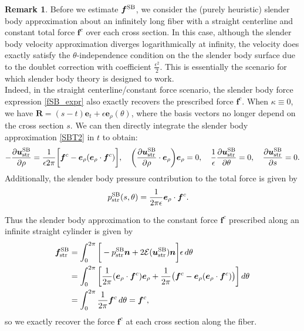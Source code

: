 \documentclass[11pt]{article}
\numberwithin{equation}{section}
\newcommand{\E}{\mathcal{E}}
\newcommand{\bu}{\bm{u}}
\newcommand{\be}{\bm{e}}
\newcommand{\p}{\partial}
\newcommand{\ts}{\thinspace}
\newcommand{\SB}{{\rm SB}}
\theoremstyle{definition}
\newtheorem{remark}[theorem]{Remark}
\begin{document}
\begin{remark} 
Before we estimate $\bm{f}^{\SB}$, we consider the (purely heuristic) slender body approximation about an infinitely long fiber with a straight centerline and constant total force $\bm{f}^c$ over each cross section. In this case, although the slender body velocity approximation diverges logarithmically at infinity, the velocity does exactly satisfy the $\theta$-independence condition on the the slender body surface due to the doublet correction with coefficient $\frac{\epsilon^2}{2}$. This is essentially the scenario for which slender body theory is designed to work.  \\
 
Indeed, in the straight centerline/constant force scenario, the slender body force expression \eqref{fSB_expr} also exactly recovers the prescribed force $\bm{f}^c$. When $\kappa\equiv0$, we have $\bm{R}= (s-t)\be_t+\epsilon\be_{\rho}(\theta)$, where the basis vectors no longer depend on the cross section $s$. We can then directly integrate the slender body approximation \eqref{SBT2} in $t$ to obtain: 
\begin{equation}\label{straight_center}
-\frac{\p \bu^{\SB}_{\text{str}}}{\p\rho} = \frac{1}{\epsilon2\pi} \bigg[\bm{f}^c - \be_{\rho}(\be_{\rho}\cdot\bm{f}^c)\bigg], \quad \bigg(\frac{\p \bu^{\SB}_{\text{str}}}{\p\rho}\cdot\be_{\rho}\bigg)\be_{\rho}  = 0, \quad
\frac{1}{\epsilon}\frac{\p \bu^{\SB}_{\text{str}}}{\p \theta} =0, \quad
\frac{\p \bu^{\SB}_{\text{str}}}{\p s} = 0.
\end{equation}
Additionally, the slender body pressure contribution to the total force is given by
\begin{equation}\label{pressure_exact}
\begin{aligned}
p^{\SB}_{\text{str}}(s,\theta) &= \frac{1}{ 2\pi \epsilon} \be_{\rho}\cdot \bm{f}^c.
\end{aligned}
\end{equation}

Thus the slender body approximation to the constant force $\bm{f}^c$ prescribed along an infinite straight cylinder is given by
\begin{equation}
\begin{aligned}
{\bm f}^{\SB}_{\text{str}} &= \int_0^{2\pi} \bigg[-p^{\SB}_{\text{str}}{\bm n} + 2\E(\bu^{\SB}_{\text{str}}){\bm n} \bigg] \epsilon \ts d\theta \\
&= \int_0^{2\pi} \bigg[\frac{1}{2\pi} (\be_{\rho}\cdot\bm{f}^c)\be_{\rho} + \frac{1}{2\pi}\big(\bm{f}^c - \be_{\rho}(\be_{\rho}\cdot\bm{f}^c)\big) \bigg] \ts d\theta \\
&= \int_0^{2\pi} \frac{1}{2\pi}\bm{f}^c \ts d\theta = \bm{f}^c,
\end{aligned}
\end{equation}
so we exactly recover the force $\bm{f}^c$ at each cross section along the fiber. \\


\end{remark}
\end{document}
